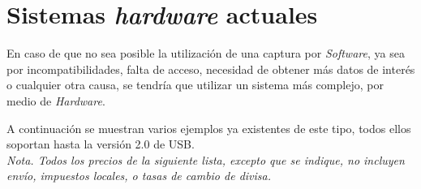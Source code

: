 
    

    


    

\section{Sistemas \emph{hardware} actuales}
En caso de que no sea posible la utilización de una captura por \emph{Software}, ya sea por incompatibilidades, falta de acceso, necesidad de obtener más datos de interés o cualquier otra causa, se tendría que utilizar un sistema más complejo, por medio de \emph{Hardware}.

A continuación se muestran varios ejemplos ya existentes de este tipo, todos ellos soportan hasta la versión 2.0 de USB. \\

\textit{Nota. Todos los precios de la siguiente lista, excepto que se indique, no incluyen envío, impuestos locales, o tasas de cambio de divisa.}

